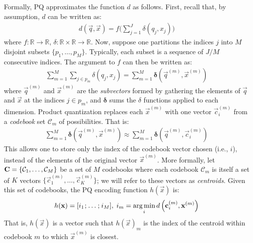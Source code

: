 Formally, PQ approximates the function $d$ as follows. First, recall that, by assumption, $d$ can be written as:
\begin{align*}
        d(\vec{q}, \vec{x}) = f \big( \sum_{j=1}^J \delta(q_j, x_j) \big)
\end{align*}
where $f: \mathbb{R} \rightarrow \mathbb{R}$, \hspace{.5mm} $\delta: \mathbb{R} \times \mathbb{R} \rightarrow \mathbb{R}$. Now, suppose one partitions the indices $j$ into $M$ disjoint subsets $\{p_1,\ldots,p_M \}$. Typically, each subset is a sequence of $J/M$ consecutive indices. %
The argument to $f$ can then be written as:
\begin{align}
        \sum_{m=1}^M \sum_{j \in p_m} \delta(q_j, x_j)
            = \sum_{m=1}^M \boldsymbol{\delta} \left( \vec{q}^{(m)}, \vec{x}^{(m)} \right)
\end{align}
where $\vec{q}^{(m)}$ and $\vec{x}^{(m)}$ are the \textit{subvectors} formed by gathering the elements of $\vec{q}$ and $\vec{x}$ at the indices $j \in p_m$, and $\boldsymbol{\delta}$ sums the $\delta$ functions applied to each dimension. Product quantization replaces each $\vec{x}^{(m)}$ with one vector $\vec{c}_i^{(m)}$ from a \textit{codebook} set $\mathcal{C}_m$ of possibilities. That is: %
\begin{align} \label{eq:pqDistNoLut}
        \sum_{m=1}^M \boldsymbol{\delta} \left( \vec{q}^{(m)}, \vec{x}^{(m)} \right) \approx \sum_{m=1}^M \boldsymbol{\delta} \left( \vec{q}^{(m)}, \vec{c}_i^{(m)} \right)
\end{align}
This allows one to store only the index of the codebook vector chosen (i.e., $i$), instead of the elements of the original vector $\vec{x}^{(m)}$. More formally, let $\mathcal{\mathbf{C}} = \{\mathcal{C}_1,\ldots,\mathcal{C}_M\}$ be a set of $M$ codebooks where each codebook $\mathcal{C}_m $ is itself a set of $K$ vectors $\{\vec{c}_{1}^{(m)},\ldots,\vec{c}_{K}^{(m)}\}$; we will refer to these vectors as \textit{centroids}. Given this set of codebooks, the PQ encoding function $h(\vec{x})$ is:
\begin{align}
    h(\vec{x}) = [ i_1 \hspace{.25mm}; \hspace{.25mm} \ldots \hspace{.25mm}; \hspace{.25mm} i_M ], \hspace{1mm} i_m = \argmin_i d \left( \vec{c}_i^{(m)}, \vec{x}^{(m)} \right)%
\end{align}
That is, $h(\vec{x})$ is a vector such that $h(\vec{x})_m$ is the index of the centroid within codebook $m$ to which $\vec{x}^{(m)}$ is closest.

